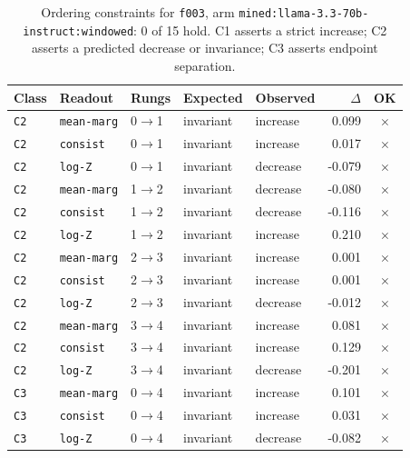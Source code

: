 \documentclass[11pt]{article}
\begin{document}
\begin{table}[htbp]
\centering
\small
\caption{Ordering constraints for \texttt{f003}, arm \texttt{mined:llama-3.3-70b-instruct:windowed}: 0 of 15 hold. C1 asserts a strict increase; C2 asserts a predicted decrease or invariance; C3 asserts endpoint separation.}
\label{tab:ladder-f003-mined-llama-3-3-70b-instruct-windowed}
\begin{tabular}{lllllrc}
\toprule
Class & Readout & Rungs & Expected & Observed & $\Delta$ & OK \\
\midrule
\texttt{C2} & \texttt{mean-marg} & 0$\to$1 & invariant & increase & 0.099 & $\times$ \\
\texttt{C2} & \texttt{consist} & 0$\to$1 & invariant & increase & 0.017 & $\times$ \\
\texttt{C2} & \texttt{log-Z} & 0$\to$1 & invariant & decrease & -0.079 & $\times$ \\
\texttt{C2} & \texttt{mean-marg} & 1$\to$2 & invariant & decrease & -0.080 & $\times$ \\
\texttt{C2} & \texttt{consist} & 1$\to$2 & invariant & decrease & -0.116 & $\times$ \\
\texttt{C2} & \texttt{log-Z} & 1$\to$2 & invariant & increase & 0.210 & $\times$ \\
\texttt{C2} & \texttt{mean-marg} & 2$\to$3 & invariant & increase & 0.001 & $\times$ \\
\texttt{C2} & \texttt{consist} & 2$\to$3 & invariant & increase & 0.001 & $\times$ \\
\texttt{C2} & \texttt{log-Z} & 2$\to$3 & invariant & decrease & -0.012 & $\times$ \\
\texttt{C2} & \texttt{mean-marg} & 3$\to$4 & invariant & increase & 0.081 & $\times$ \\
\texttt{C2} & \texttt{consist} & 3$\to$4 & invariant & increase & 0.129 & $\times$ \\
\texttt{C2} & \texttt{log-Z} & 3$\to$4 & invariant & decrease & -0.201 & $\times$ \\
\texttt{C3} & \texttt{mean-marg} & 0$\to$4 & invariant & increase & 0.101 & $\times$ \\
\texttt{C3} & \texttt{consist} & 0$\to$4 & invariant & increase & 0.031 & $\times$ \\
\texttt{C3} & \texttt{log-Z} & 0$\to$4 & invariant & decrease & -0.082 & $\times$ \\
\bottomrule
\end{tabular}
\end{table}
\end{document}
